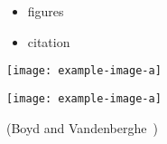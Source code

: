 \documentclass[landscape]{foils}
\begin{document}
\vfs
\begin{itemize}\itemsep=20pt
    \item figures
    \item citation
\end{itemize}
\vfs

\vfs
\begin{minipage}{0.5\textwidth}
    \centering
    \texttt{[image: example-image-a]}
\end{minipage}%
\begin{minipage}{0.5\textwidth}
    \centering
    \texttt{[image: example-image-a]}
\end{minipage}
\vfs

(Boyd and Vandenberghe~\cite{boyd2004convex})

\end{document}
